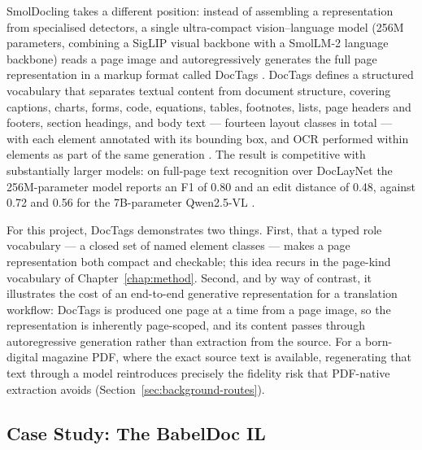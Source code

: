 SmolDocling takes a different position: instead of assembling a
representation from specialised detectors, a single ultra-compact
vision--language model (256M parameters, combining a SigLIP visual
backbone with a SmolLM-2 language backbone) reads a page image and
autoregressively generates the full page representation in a markup
format called DocTags \cite{smoldocling2025}. DocTags defines a
structured vocabulary that separates textual content from document
structure, covering captions, charts, forms, code, equations, tables,
footnotes, lists, page headers and footers, section headings, and body
text --- fourteen layout classes in total --- with each element
annotated with its bounding box, and OCR performed within elements as
part of the same generation \cite{smoldocling2025}. The result is
competitive with substantially larger models: on full-page text
recognition over DocLayNet the 256M-parameter model reports an F1 of
0.80 and an edit distance of 0.48, against 0.72 and 0.56 for the
7B-parameter Qwen2.5-VL \cite{smoldocling2025}.

For this project, DocTags demonstrates two things. First, that a typed
role vocabulary --- a closed set of named element classes --- makes a
page representation both compact and checkable; this idea recurs in the
page-kind vocabulary of Chapter~\ref{chap:method}. Second, and by way
of contrast, it illustrates the cost of an end-to-end generative
representation for a translation workflow: DocTags is produced one page
at a time from a page image, so the representation is inherently
page-scoped, and its content passes through autoregressive generation
rather than extraction from the source. For a born-digital magazine
PDF, where the exact source text is available, regenerating that text
through a model reintroduces precisely the fidelity risk that
PDF-native extraction avoids (Section~\ref{sec:background-routes}).

\subsection{Case Study: The BabelDoc IL}

